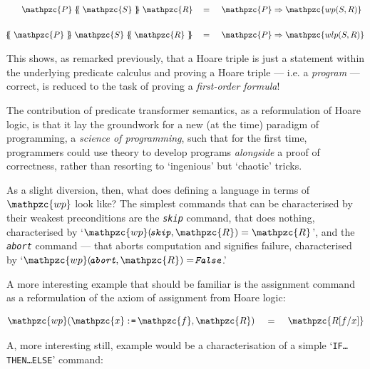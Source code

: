 \documentclass[oneside,12pt]{article}
\newcommand{\agdamath}[1]{\emph{\texttt{\!#1}}}
\newcommand{\impcode}[1]{\textsc{\texttt{#1}}}
\newcommand{\codevar}[1]{\ensuremath{\mathpzc{#1}}}
\newcommand{\textM}[1]{\ensuremath{\mathpzc{#1}}}
\newcommand{\hpc}[3]{\! \textM{#1} \;  \{\!\!\{ \; \textM{#2} \;  \}\!\!\}  \; \textM{#3} \!}
\newcommand{\gtc}[3]{\!  \{\!\!\{ \; \textM{#1} \; \}\!\!\} \; \textM{#2} \;  \{\!\!\{ \; \textM{#3} \; \}\!\!\} \!}
\begin{document}
\begin{centering}
  \begin{equation}
    \label{eq:hoare-trip=wp}
    \begin{aligned}
      \hpc{P}{S}{R} \;\;\;\; &= \;\;\;\; \textM{P} \Rightarrow \textM{wp(S,R)} \\
      \, \\
      \gtc{P}{S}{R} \;\;\;\; &= \;\;\;\; \textM{P} \Rightarrow \textM{wlp(S,R)}
    \end{aligned}
  \end{equation}
\end{centering}


This shows, as remarked previously, that a Hoare triple is just a statement within the underlying predicate calculus and proving a Hoare triple --- i.e. a \emph{program} --- correct, is reduced to the task of proving a \emph{first-order formula}! 

The contribution of predicate transformer semantics, as a reformulation of Hoare logic, is that it lay the groundwork for a new (at the time) paradigm of programming, a \emph{science of programming}\cite{Gries81}, such that for the first time, programmers could use theory to develop programs \emph{alongside} a proof of correctness, rather than resorting to `ingenious' but `chaotic' tricks.

As a slight diversion, then, what does defining a language in terms of \textM{wp} look like? The simplest commands that can be characterised by their weakest preconditions are the \agdamath{skip} command, that does nothing, characterised by `$\textM{wp}( \agdamath{skip}  ,\textM{R}) = \textM{R}$', and the \agdamath{abort} command --- that aborts computation and signifies failure, characterised by `$\textM{wp}( \agdamath{abort}  ,\textM{R})  = \agdamath{False}$.'

A more interesting example that should be familiar is the assignment command as a reformulation of the axiom of assignment from Hoare logic:

\begin{centering}
  \begin{equation}
    \label{eq:wp-assi}
    \textM{wp}(\codevar{x} \, \impcode{:=} \, \codevar{f},\textM{R}) \;\;\;\; = \;\;\;\; \textM{R[f/x]}
  \end{equation}
\end{centering}



A, more interesting still, example would be a characterisation of a simple `\impcode{IF\ldots THEN\ldots ELSE}' command:
\end{document}
